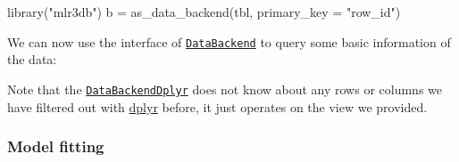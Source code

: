 \documentclass[]{article}
\newenvironment{Shaded}{}{}
\newcommand{\DataTypeTok}[1]{#1}
\newcommand{\KeywordTok}[1]{\textcolor[rgb]{0.00,0.00,1.00}{#1}}
\newcommand{\NormalTok}[1]{#1}
\newcommand{\OperatorTok}[1]{#1}
\newcommand{\StringTok}[1]{\textcolor[rgb]{0.00,0.50,0.50}{#1}}
\renewenvironment{Shaded} {\begin{snugshade}\small} {\end{snugshade}}
\begin{document}
\begin{Shaded}
\begin{Highlighting}[]
\KeywordTok{library}\NormalTok{(}\StringTok{"mlr3db"}\NormalTok{)}
\NormalTok{b =}\StringTok{ }\KeywordTok{as_data_backend}\NormalTok{(tbl, }\DataTypeTok{primary_key =} \StringTok{"row_id"}\NormalTok{)}
\end{Highlighting}
\end{Shaded}

We can now use the interface of \href{https://mlr3.mlr-org.com/reference/DataBackend.html}{\texttt{DataBackend}} to query some basic information of the data:

\begin{Shaded}
\end{Shaded}

Note that the \href{https://mlr3db.mlr-org.com/reference/DataBackendDplyr.html}{\texttt{DataBackendDplyr}} does not know about any rows or columns we have filtered out with \href{https://cran.r-project.org/package=dplyr}{dplyr} before, it just operates on the view we provided.

\hypertarget{model-fitting}{%
\subsubsection{Model fitting}\label{model-fitting}}
\end{document}
